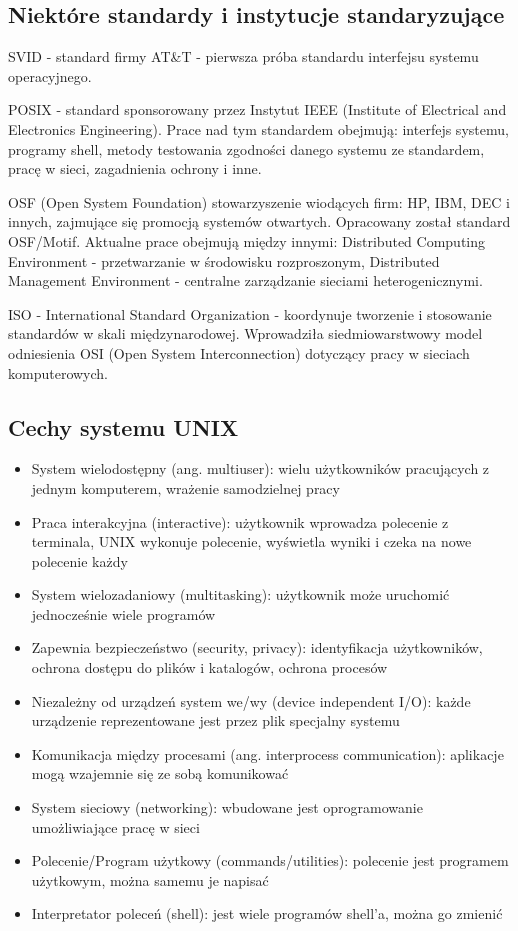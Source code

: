 \documentclass[11pt]{article}
\begin{document}
\subsection{Niektóre standardy i instytucje standaryzujące}

SVID - standard firmy AT\&T - pierwsza próba standardu interfejsu systemu operacyjnego.

POSIX - standard sponsorowany przez Instytut IEEE (Institute of Electrical and Electronics
Engineering). Prace nad tym standardem obejmują: interfejs systemu, programy shell, metody
testowania zgodności danego systemu ze standardem, pracę w sieci, zagadnienia ochrony i inne.

OSF (Open System Foundation) stowarzyszenie wiodących firm: HP, IBM, DEC i innych,
zajmujące się promocją systemów otwartych. Opracowany został standard OSF/Motif.
Aktualne prace obejmują między innymi: Distributed Computing Environment - przetwarzanie w
środowisku rozproszonym, Distributed Management Environment - centralne zarządzanie sieciami
heterogenicznymi.

ISO - International Standard Organization - koordynuje tworzenie i stosowanie standardów w skali
międzynarodowej. Wprowadziła siedmiowarstwowy model odniesienia OSI (Open System
Interconnection) dotyczący pracy w sieciach komputerowych.

\subsection{Cechy systemu UNIX}

\begin{itemize}
    \item System wielodostępny (ang. multiuser): wielu użytkowników pracujących z jednym komputerem, wrażenie samodzielnej pracy
    \item Praca interakcyjna (interactive):
          użytkownik wprowadza polecenie z terminala, UNIX wykonuje polecenie, wyświetla wyniki i czeka na nowe polecenie każdy
    \item System wielozadaniowy (multitasking): użytkownik może uruchomić jednocześnie wiele programów
    \item Zapewnia bezpieczeństwo (security, privacy): identyfikacja użytkowników, ochrona dostępu do plików i katalogów, ochrona procesów
    \item Niezależny od urządzeń system we/wy (device independent I/O): każde urządzenie reprezentowane jest przez plik specjalny systemu
    \item Komunikacja między procesami (ang. interprocess communication): aplikacje mogą wzajemnie się ze sobą komunikować
    \item System sieciowy (networking): wbudowane jest oprogramowanie umożliwiające pracę w sieci
    \item Polecenie/Program użytkowy (commands/utilities): polecenie jest programem użytkowym, można samemu je napisać
    \item Interpretator poleceń (shell): jest wiele programów shell'a, można go zmienić
\end{itemize}
\end{document}
